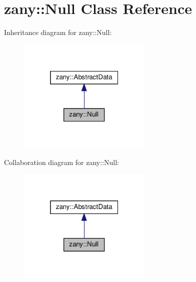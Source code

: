 \hypertarget{classzany_1_1_null}{}\section{zany\+:\+:Null Class Reference}
\label{classzany_1_1_null}


Inheritance diagram for zany\+:\+:Null\+:
\nopagebreak
\begin{figure}[H]
\begin{center}
\leavevmode
\includegraphics[width=181pt]{classzany_1_1_null__inherit__graph}
\end{center}
\end{figure}


Collaboration diagram for zany\+:\+:Null\+:
\nopagebreak
\begin{figure}[H]
\begin{center}
\leavevmode
\includegraphics[width=181pt]{classzany_1_1_null__coll__graph}
\end{center}
\end{figure}
